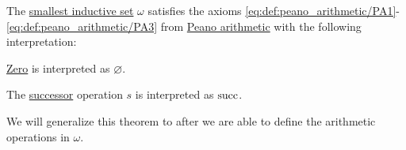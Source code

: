 \begin{theorem}\label{thm:omega_is_model_of_pa_without_operations}
  The \hyperref[thm:smallest_inductive_set_existence]{smallest inductive set} \( \omega \) satisfies the axioms \eqref{eq:def:peano_arithmetic/PA1}-\eqref{eq:def:peano_arithmetic/PA3} from \hyperref[def:peano_arithmetic]{Peano arithmetic} with the following interpretation:
  \begin{thmenum}
     \hyperref[def:peano_arithmetic/zero]{Zero} is interpreted as \( \varnothing \).

     The \hyperref[def:peano_arithmetic/succ]{successor} operation \( s \) is interpreted as \( \operatorname{succ} \).
  \end{thmenum}

  We will generalize this theorem to  after we are able to define the arithmetic operations in \( \omega \).
\end{theorem}
